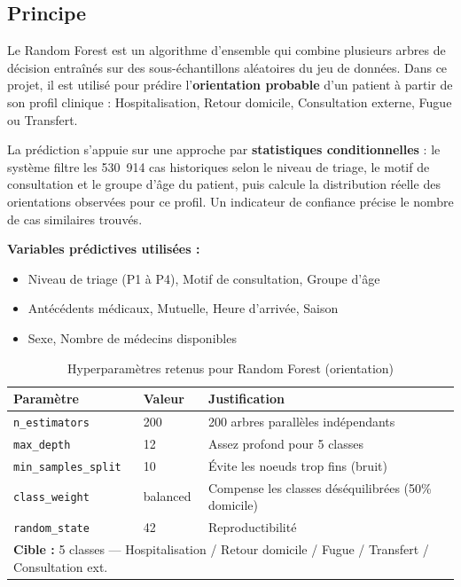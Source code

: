 \documentclass[12pt,a4paper]{report}
\begin{document}
	\subsection{Principe}
	
	Le Random Forest est un algorithme d'ensemble qui combine plusieurs arbres de décision
	entraînés sur des sous-échantillons aléatoires du jeu de données. Dans ce projet, il est
	utilisé pour prédire l'\textbf{orientation probable} d'un patient à partir de son profil
	clinique : Hospitalisation, Retour domicile, Consultation externe, Fugue ou Transfert.
	
	La prédiction s'appuie sur une approche par \textbf{statistiques conditionnelles} : le
	système filtre les 530~914 cas historiques selon le niveau de triage, le motif de
	consultation et le groupe d'âge du patient, puis calcule la distribution réelle des
	orientations observées pour ce profil. Un indicateur de confiance précise le nombre de
	cas similaires trouvés.
	
	\textbf{Variables prédictives utilisées :}
	\begin{itemize}
		\item Niveau de triage (P1 à P4), Motif de consultation, Groupe d'âge
		\item Antécédents médicaux, Mutuelle, Heure d'arrivée, Saison
		\item Sexe, Nombre de médecins disponibles
	\end{itemize}
	
	\begin{table}[H]
		\centering
		\caption{Hyperparamètres retenus pour Random Forest (orientation)}
		\renewcommand{\arraystretch}{1.3}
		\begin{tabular}{lll}
			\toprule
			\textbf{Paramètre} & \textbf{Valeur} & \textbf{Justification} \\
			\midrule
			\texttt{n\_estimators}      & 200        & 200 arbres parallèles indépendants \\
			\texttt{max\_depth}         & 12         & Assez profond pour 5 classes \\
			\texttt{min\_samples\_split} & 10        & Évite les noeuds trop fins (bruit) \\
			\texttt{class\_weight}      & balanced   & Compense les classes déséquilibrées (50\% domicile) \\
			\texttt{random\_state}      & 42         & Reproductibilité \\
			\midrule
			\multicolumn{3}{l}{\textbf{Cible :} 5 classes — Hospitalisation / Retour domicile / Fugue / Transfert / Consultation ext.} \\
			\bottomrule
		\end{tabular}
	\end{table}
	
\end{document}
